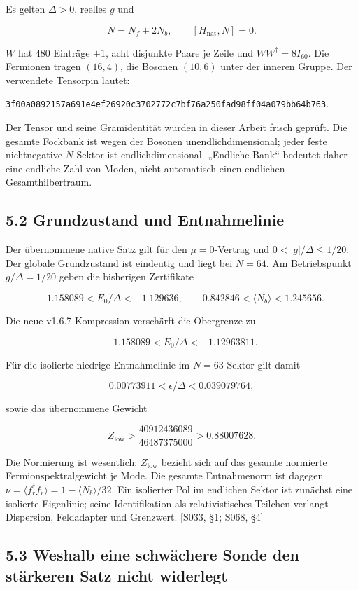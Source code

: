 Es gelten \(\Delta>0\), reelles \(g\) und

\[N=N_f+2N_b,\qquad [H_{\mathrm{nat}},N]=0.\]

\(W\) hat 480 Einträge \(\pm1\), acht disjunkte Paare je Zeile und
\(WW^\dagger=8I_{60}\). Die Fermionen tragen \((16,4)\), die Bosonen
\((10,6)\) unter der inneren Gruppe. Der verwendete Tensorpin lautet:

\texttt{3f00a0892157a691e4ef26920c3702772c7bf76a250fad98ff04a079bb64b763}.

Der Tensor und seine Gramidentität wurden in dieser Arbeit frisch
geprüft. Die gesamte Fockbank ist wegen der Bosonen
unendlichdimensional; jeder feste nichtnegative \(N\)-Sektor ist
endlichdimensional. „Endliche Bank`` bedeutet daher eine endliche Zahl
von Moden, nicht automatisch einen endlichen Gesamthilbertraum.

\subsection{5.2 Grundzustand und
Entnahmelinie}\label{grundzustand-und-entnahmelinie}

Der übernommene native Satz gilt für den \(\mu=0\)-Vertrag und
\(0<|g|/\Delta\le1/20\): Der globale Grundzustand ist eindeutig und
liegt bei \(N=64\). Am Betriebspunkt \(g/\Delta=1/20\) geben die
bisherigen Zertifikate

\[-1.158089<E_0/\Delta<-1.129636,
\qquad 0.842846<\langle N_b\rangle<1.245656.\]

Die neue v1.6.7-Kompression verschärft die Obergrenze zu

\[\boxed{-1.158089<E_0/\Delta<-1.12963811.}\]

Für die isolierte niedrige Entnahmelinie im \(N=63\)-Sektor gilt damit

\[\boxed{0.00773911<\epsilon/\Delta<0.039079764,}\]

sowie das übernommene Gewicht

\[Z_{\mathrm{low}}>\frac{40912436089}{46487375000}>0.88007628.\]

Die Normierung ist wesentlich: \(Z_{\mathrm{low}}\) bezieht sich auf das
gesamte normierte Fermionspektralgewicht je Mode. Die gesamte
Entnahmenorm ist dagegen
\(\nu=\langle f_r^\dagger f_r\rangle=1-\langle N_b\rangle/32\). Ein
isolierter Pol im endlichen Sektor ist zunächst eine isolierte
Eigenlinie; seine Identifikation als relativistisches Teilchen verlangt
Dispersion, Feldadapter und Grenzwert. {[}S033, §1; S068, §4{]}

\subsection{5.3 Weshalb eine schwächere Sonde den stärkeren Satz nicht
widerlegt}\label{weshalb-eine-schwuxe4chere-sonde-den-stuxe4rkeren-satz-nicht-widerlegt}

